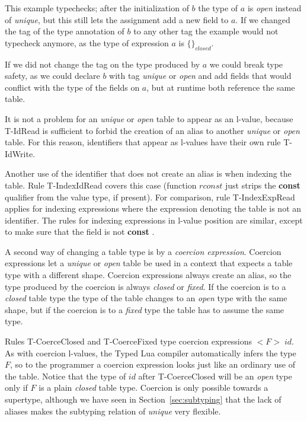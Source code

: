 \documentclass[preprint]{sigplanconf}
\begin{document}
This example typechecks; after the initialization of $b$
the type of $a$ is {\em open} instead of {\em unique}, but
this still lets the assignment add a new field to $a$.
If we changed the tag of the type annotation of $b$ to
any other tag the example would not typecheck anymore,
as the type of expression $a$ is $\{\}_{closed}$.

If we did not change the tag on the type produced by $a$
we could break type safety, as we could declare $b$ with
tag {\em unique} or {\em open} and add fields that would
conflict with the type of the fields on $a$, but at
runtime both reference the same table. 

It is not a problem for an {\em unique} or {\em open}
table to appear as an l-value, because {\sc T-IdRead} is
sufficient to forbid the creation of an alias to another
{\em unique} or {\em open} table. For this reason,
identifiers that appear as l-values have their own rule
{\sc T-IdWrite}.

Another use of the identifier that does not create an
alias is when indexing the table. Rule {\sc T-IndexIdRead}
covers this case (function $rconst$ just strips the {\bf const} qualifier from the value type, if present). For comparison, rule {\sc T-IndexExpRead}
applies for indexing expressions where the expression
denoting the table is not an identifier. The rules for
indexing expressions in l-value position are similar,
except to make sure that the field is not {\bf const} .

A second way of changing a table type is by a 
{\em coercion expression}. Coercion expressions let
a {\em unique} or {\em open} table be used in a context
that expects a table type with a different shape.
Coercion expressions always create an alias, so
the type produced by the coercion is always
{\em closed} or {\em fixed}. If the coercion is to a
{\em closed} table type the type of the table changes
to an {\em open} type with the same shape, but if
the coercion is to a {\em fixed} type the table has
to assume the same type.

Rules {\sc T-CoerceClosed} and {\sc T-CoerceFixed} type
coercion expressions ${<}F{>} \; id$.
As with coercion l-values, the Typed Lua compiler automatically
infers the type $F$, so to the programmer a coercion
expression looks just like an ordinary use of the table.
Notice that the type of $id$ after {\sc T-CoerceClosed} will be an {\em open} type
only if $F$ is a plain {\em closed} table type.
Coercion is only possible towards a supertype, although
we have seen in Section~\ref{sec:subtyping} that the lack
of aliases makes the subtyping relation of {\em unique}
very flexible.
\end{document}
